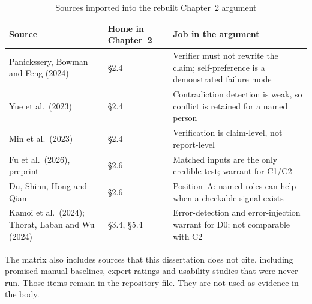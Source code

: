\begin{table}[htbp]
  \centering
  \scriptsize
  \setlength{\tabcolsep}{3pt}
  \begin{tabularx}{\textwidth}{@{}P{0.28\textwidth}P{0.22\textwidth}Y@{}}
    \toprule
    \textbf{Source} & \textbf{Home in Chapter~2} & \textbf{Job in the argument} \\
    \midrule
    Panickssery, Bowman and Feng (2024) & §2.4 & Verifier must not rewrite the claim; self-preference is a demonstrated failure mode \\
    Yue et al.\ (2023) & §2.4 & Contradiction detection is weak, so conflict is retained for a named person \\
    Min et al.\ (2023) & §2.4 & Verification is claim-level, not report-level \\
    Fu et al.\ (2026), preprint & §2.6 & Matched inputs are the only credible test; warrant for C1/C2 \\
    Du, Shinn, Hong and Qian & §2.6 & Position~A: named roles can help when a checkable signal exists \\
    Kamoi et al.\ (2024); Thorat, Laban and Wu (2024) & §3.4, §5.4 & Error-detection and error-injection warrant for D0; not comparable with C2 \\
    \bottomrule
  \end{tabularx}
  \caption{Sources imported into the rebuilt Chapter~2 argument}
  \label{tab:lit-imported-sources}
\end{table}

The matrix also includes sources that this dissertation does not cite, including promised manual
baselines, expert ratings and usability studies that were never run. Those items remain in the
repository file. They are not used as evidence in the body.


